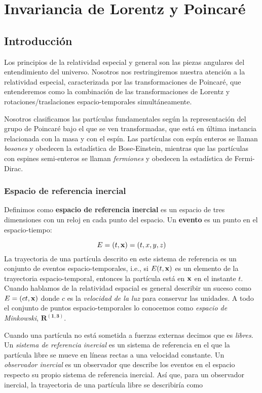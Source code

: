 
\chapter{Invariancia de Lorentz y Poincaré}

\section{Introducción}

Los principios de la relatividad especial y general son las piezas angulares del entendimiento del universo. Nosotros nos restringiremos nuestra atención a la relatividad especial, caracterizada por las transformaciones de Poincaré, que entenderemos como la combinación de las transformaciones de Lorentz y rotaciones/traslaciones espacio-temporales simultáneamente.  

Nosotros clasificamos las partículas fundamentales según la representación del grupo de Poincaré bajo el que se ven transformadas, que está en última instancia relacionada con la masa y con el espín. Las partículas con espín enteros se llaman \textit{bosones} y obedecen la estadística de Bose-Einstein, mientras que las partículas con espines semi-enteros se llaman \textit{fermiones} y obedecen la estadística de Fermi-Dirac.

\subsection{Espacio de referencia inercial}

Definimos como \textbf{espacio de referencia inercial} es un espacio de tres dimensiones con un reloj en cada punto del espacio. Un \textbf{evento} es un punto en el espacio-tiempo:

\begin{equation}
	E = (t,\mathbf{x}) = (t,x,y,z)
\end{equation}
La trayectoria de una partícula descrito en este sistema de referencia es un conjunto de eventos espacio-temporales, i.e., si $E(t,\mathbf{x})$ es un elemento de la trayectoria espacio-temporal, entonces la partícula está en $\mathbf{x}$ en el instante $t$. Cuando hablamos de la relatividad espacial es general describir un suceso como $E=(ct,\mathbf{x})$ donde $c$ es la \textit{velocidad de la luz} para conservar las unidades. A todo el conjunto de puntos espacio-temporales lo conocemos como \textit{espacio de Minkowski}, $\mathbf{R^{(1,3)}}$. 

Cuando una partícula no está sometida a fuerzas externas decimos que es \textit{libres}. Un \textit{sistema de referencia inercial} es un sistema de referencia  en el que la partícula libre se mueve en líneas rectas a una velocidad constante. Un \textit{observador inercial} es un observador que describe los eventos en el espacio respecto su propio sistema de referencia inercial. Así que, para un observador inercial, la trayectoria de una partícula libre se describiría como

